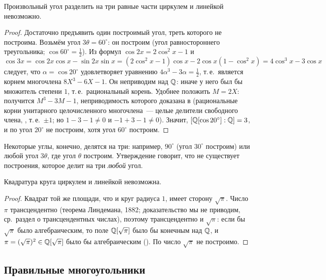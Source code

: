 \begin{corollary}[1.40]
Произвольный угол разделить на три равные части циркулем и линейкой невозможно.
\end{corollary}

\begin{proof}
Достаточно предъявить один построимый угол, треть которого не построима. Возьмём угол $3\theta=60^\circ$: он
построим (угол равностороннего треугольника; $\cos60^\circ=\frac12$). Из формул $\cos2x=2\cos^2x-1$ и
\[
\cos3x=\cos2x\cos x-\sin2x\sin x=(2\cos^2x-1)\cos x-2\cos x(1-\cos^2x)=4\cos^3x-3\cos x
\]
следует, что $\alpha=\cos20^\circ$ удовлетворяет уравнению $4\alpha^3-3\alpha=\frac12$, т.\,е.\ является корнем многочлена
$8X^3-6X-1$. Он неприводим над $\mathbb Q$: иначе у него был бы множитель степени $1$, т.\,е.\ рациональный корень. Удобнее
положить $M=2X$: получится $M^3-3M-1$, неприводимость которого доказана в  (рациональные корни унитарного
целочисленного многочлена~--- целые делители свободного члена, , т.\,е.\ $\pm1$; но $1-3-1\ne0$ и
$-1+3-1\ne0$). Значит, $[\mathbb Q[\cos20^\circ]:\mathbb Q]=3$, и по
 угол $20^\circ$ не построим, хотя угол $60^\circ$ построим.
\end{proof}

Некоторые углы, конечно, делятся на три: например, $90^\circ$ (угол $30^\circ$ построим) или любой угол $3\theta$, где угол
$\theta$ построим. Утверждение  говорит, что не существует построения, которое делит на три \emph{любой} угол.

\begin{corollary}[1.41]
Квадратура круга циркулем и линейкой невозможна.
\end{corollary}

\begin{proof}
Квадрат той же площади, что и круг радиуса $1$, имеет сторону $\sqrt\pi$. Число $\pi$ трансцендентно (теорема
Линдемана, 1882; доказательство мы не приводим, ср.\ раздел о трансцендентных числах), поэтому трансцендентно и
$\sqrt\pi$: если бы $\sqrt\pi$ было алгебраическим, то поле $\mathbb Q[\sqrt\pi]$ было бы конечным над $\mathbb Q$, и
$\pi=(\sqrt\pi)^2\in\mathbb Q[\sqrt\pi]$ было бы алгебраическим (). По  число $\sqrt\pi$ не построимо.
\end{proof}

\subsection*{Правильные многоугольники}

